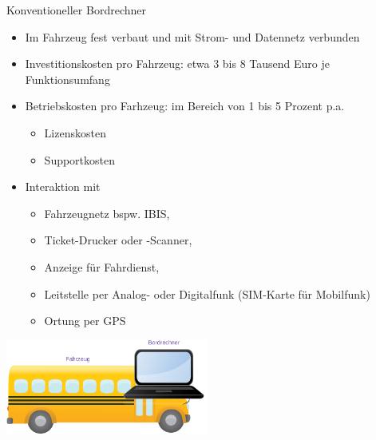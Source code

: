 
\begin{frame}{Konventioneller Bordrechner}
  \begin{itemize}
  \item Im Fahrzeug fest verbaut und mit Strom- und Datennetz verbunden
  \item Investitionskosten pro Fahrzeug: etwa 3 bis 8 Tausend Euro je Funktionsumfang
  \item Betriebskosten pro Farhzeug: im Bereich von 1 bis 5 Prozent p.a.
    \begin{itemize}
    \item Lizenskosten
    \item Supportkosten
    \end{itemize}
  \item Interaktion mit
    \begin{itemize}
    \item Fahrzeugnetz bspw. IBIS,
    \item Ticket-Drucker oder -Scanner,
    \item Anzeige für Fahrdienst,
    \item Leitstelle per Analog- oder Digitalfunk (SIM-Karte für Mobilfunk)
    \item Ortung per GPS
    \end{itemize}
  \end{itemize}
  \includegraphics[width=0.5\textwidth]{public-transport/bus.png}
\end{frame}

